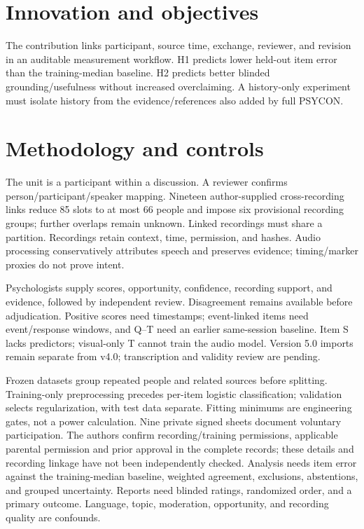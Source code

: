 \documentclass{article}
\begin{document}
\section{Innovation and objectives}
The contribution links participant, source time, exchange, reviewer, and revision in an auditable measurement workflow. H1 predicts lower held-out item error than the training-median baseline. H2 predicts better blinded grounding/usefulness without increased overclaiming. A history-only experiment must isolate history from the evidence/references also added by full PSYCON.

\newpage
\section{Methodology and controls}
The unit is a participant within a discussion. A reviewer confirms person/participant/speaker mapping. Nineteen author-supplied cross-recording links reduce 85 slots to at most 66 people and impose six provisional recording groups; further overlaps remain unknown. Linked recordings must share a partition. Recordings retain context, time, permission, and hashes. Audio processing conservatively attributes speech and preserves evidence; timing/marker proxies do not prove intent.

Psychologists supply scores, opportunity, confidence, recording support, and evidence, followed by independent review. Disagreement remains available before adjudication. Positive scores need timestamps; event-linked items need event/response windows, and Q--T need an earlier same-session baseline. Item S lacks predictors; visual-only T cannot train the audio model. Version 5.0 imports remain separate from v4.0; transcription and validity review are pending.

Frozen datasets group repeated people and related sources before splitting. Training-only preprocessing precedes per-item logistic classification; validation selects regularization, with test data separate. Fitting minimums are engineering gates, not a power calculation. Nine private signed sheets document voluntary participation. The authors confirm recording/training permissions, applicable parental permission and prior approval in the complete records; these details and recording linkage have not been independently checked. Analysis needs item error against the training-median baseline, weighted agreement, exclusions, abstentions, and grouped uncertainty. Reports need blinded ratings, randomized order, and a primary outcome. Language, topic, moderation, opportunity, and recording quality are confounds.
\end{document}
